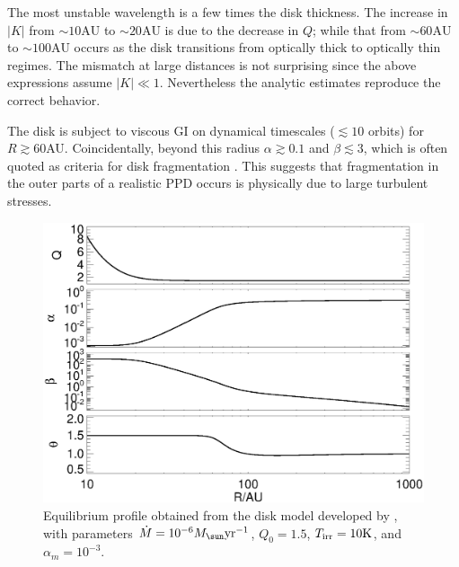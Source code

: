 The most unstable wavelength is a few times the disk thickness. The
increase in $|K|$ from $\sim 10\mathrm{AU}$ to $\sim 20\mathrm{AU}$ is
due to the decrease in $Q$; while that from $\sim 60\mathrm{AU}$ to
$\sim 100\mathrm{AU}$ occurs as the disk transitions from optically
thick to optically thin regimes. The mismatch at large distances is
not surprising since the above expressions assume $|K|\ll
1$. Nevertheless the analytic estimates reproduce the correct
behavior.  

The disk is subject to viscous GI on dynamical timescales ($\lesssim
10$ orbits) for $R\gtrsim60$AU. Coincidentally, beyond this radius
$\alpha\gtrsim 0.1$ and $\beta\lesssim 3$, which is often quoted as 
criteria for disk fragmentation \citep[e.g.][]{rafikov15}. 
This suggests that fragmentation in the outer parts of a realistic PPD
occurs is physically due to large turbulent stresses. 





\begin{figure}
  \includegraphics[width=\linewidth,clip=true,trim=0cm 0cm 0cm
    0.0cm]{figures/ppd_2d_basic}
  \caption{Equilibrium profile obtained from the disk model developed
    by \cite{rafikov15}, with parameters $\dot{M} =
    10^{-6}M_\sun\yr^{-1}$, $Q_0=1.5$, $T_\mathrm{irr}=10\mathrm{K}$, and
    $\alpha_m=10^{-3}$.   
    \label{rafikov_model}}
\end{figure}

